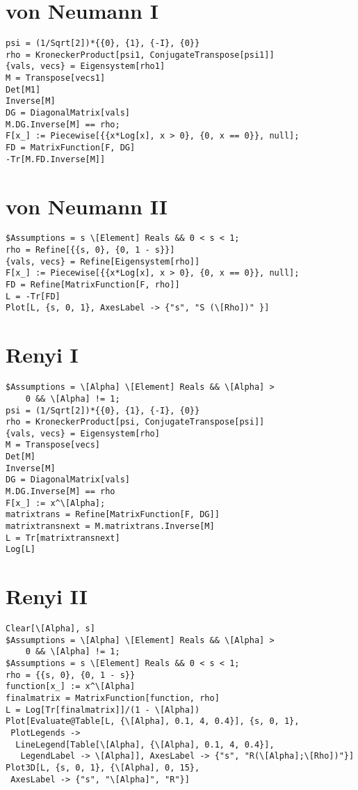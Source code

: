 \section{von Neumann I}
\begin{verbatim}
psi = (1/Sqrt[2])*{{0}, {1}, {-I}, {0}}
rho = KroneckerProduct[psi1, ConjugateTranspose[psi1]]
{vals, vecs} = Eigensystem[rho1]
M = Transpose[vecs1]
Det[M1]
Inverse[M]
DG = DiagonalMatrix[vals]
M.DG.Inverse[M] == rho;
F[x_] := Piecewise[{{x*Log[x], x > 0}, {0, x == 0}}, null];
FD = MatrixFunction[F, DG]
-Tr[M.FD.Inverse[M]]
\end{verbatim}
\section{von Neumann II}
\begin{verbatim}
$Assumptions = s \[Element] Reals && 0 < s < 1;
rho = Refine[{{s, 0}, {0, 1 - s}}]
{vals, vecs} = Refine[Eigensystem[rho]]
F[x_] := Piecewise[{{x*Log[x], x > 0}, {0, x == 0}}, null];
FD = Refine[MatrixFunction[F, rho]]
L = -Tr[FD]
Plot[L, {s, 0, 1}, AxesLabel -> {"s", "S (\[Rho])" }]
\end{verbatim}
\section{Renyi I}
\begin{verbatim}
$Assumptions = \[Alpha] \[Element] Reals && \[Alpha] > 
    0 && \[Alpha] != 1;
psi = (1/Sqrt[2])*{{0}, {1}, {-I}, {0}}
rho = KroneckerProduct[psi, ConjugateTranspose[psi]]
{vals, vecs} = Eigensystem[rho]
M = Transpose[vecs]
Det[M]
Inverse[M]
DG = DiagonalMatrix[vals]
M.DG.Inverse[M] == rho
F[x_] := x^\[Alpha];
matrixtrans = Refine[MatrixFunction[F, DG]]
matrixtransnext = M.matrixtrans.Inverse[M]
L = Tr[matrixtransnext]
Log[L]
\end{verbatim}
\section{Renyi II}
\begin{verbatim}
Clear[\[Alpha], s]
$Assumptions = \[Alpha] \[Element] Reals && \[Alpha] > 
    0 && \[Alpha] != 1;
$Assumptions = s \[Element] Reals && 0 < s < 1;
rho = {{s, 0}, {0, 1 - s}}
function[x_] := x^\[Alpha]
finalmatrix = MatrixFunction[function, rho]
L = Log[Tr[finalmatrix]]/(1 - \[Alpha])
Plot[Evaluate@Table[L, {\[Alpha], 0.1, 4, 0.4}], {s, 0, 1}, 
 PlotLegends -> 
  LineLegend[Table[\[Alpha], {\[Alpha], 0.1, 4, 0.4}], 
   LegendLabel -> \[Alpha]], AxesLabel -> {"s", "R(\[Alpha];\[Rho])"}]
Plot3D[L, {s, 0, 1}, {\[Alpha], 0, 15}, 
 AxesLabel -> {"s", "\[Alpha]", "R"}]
\end{verbatim}
